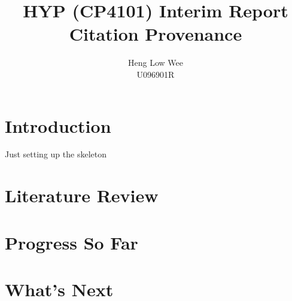 \documentclass[12 pt]{article}
\begin{document}

\title{HYP (CP4101) Interim Report \\ Citation Provenance}
\author{Heng Low Wee \\ U096901R}
\maketitle


\section{Introduction}
Just setting up the skeleton\cite{itmakessense}
\section{Literature Review}
\section{Progress So Far}
\section{What's Next}

\end{document}
